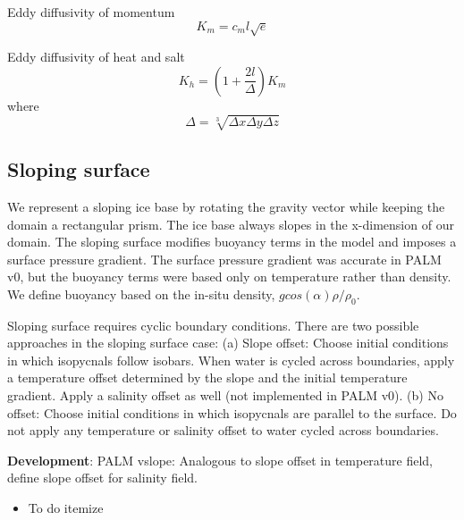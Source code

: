 \documentclass[letterpaper,10pt]{report}
\newcommand{\code}[1]{\texttt{#1}} %
\begin{document}
	Eddy diffusivity of momentum
	\begin{equation} \label{eq:Km}
	K_m = c_m l \sqrt{e}
	\end{equation}

	Eddy diffusivity of heat and salt
	\begin{equation} \label{eq:Kh}
	K_h = (1+\frac{2l}{\Delta})K_m
	\end{equation}
    where
	\begin{equation} \label{eq:gridl}
	\Delta = \sqrt[3]{\Delta x \Delta y \Delta z}
	\end{equation}
	
	\newpage
	\subsection{Sloping surface}
	We represent a sloping ice base by rotating the gravity vector while keeping the domain a rectangular prism. The ice base always slopes in the x-dimension of our domain. The sloping surface modifies buoyancy terms in the model and imposes a surface pressure gradient. The surface pressure gradient was accurate in PALM v0, but the buoyancy terms were based only on temperature rather than density. We define buoyancy based on the in-situ density, $g cos(\alpha) \rho/\rho_0$.
		
	Sloping surface requires cyclic boundary conditions. There are two possible approaches in the sloping surface case:
	(a) Slope offset: Choose initial conditions in which isopycnals follow isobars. When water is cycled across boundaries, apply a temperature offset determined by the slope and the initial temperature gradient. Apply a salinity offset as well (not implemented in PALM v0).
	(b) No offset: Choose initial conditions in which isopycnals are parallel to the surface. Do not apply any temperature or salinity offset to water cycled across boundaries.  
	
	\textbf{Development}:
	PALM vslope: Analogous to slope offset in temperature field, define slope offset for salinity field.
	\begin{itemize}
		\item To do itemize
	\end{itemize}
	\newpage		
\end{document}
